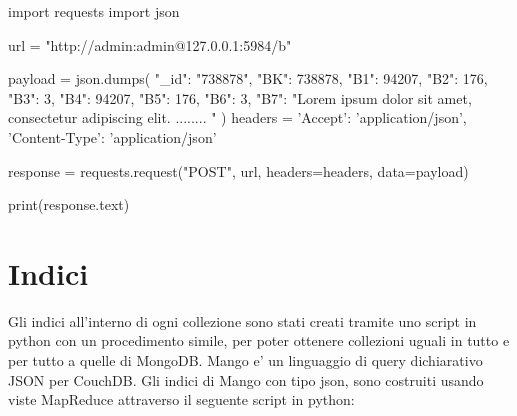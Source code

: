\begin{Verbatim*}
import requests
import json

url = "http://admin:admin@127.0.0.1:5984/b"

payload = json.dumps({
  "_id": "738878",
  "BK": 738878,
  "B1": 94207,
  "B2": 176,
  "B3": 3,
  "B4": 94207,
  "B5": 176,
  "B6": 3,
  "B7": "Lorem ipsum dolor sit amet, consectetur adipiscing elit. ........ " 
})
headers = {
  'Accept': 'application/json', 
  'Content-Type': 'application/json'
}

response = requests.request("POST", url, headers=headers, data=payload)

print(response.text)
\end{Verbatim*}

\section{Indici}

Gli indici all'interno di ogni collezione sono stati creati tramite uno script in python con un procedimento simile, per poter ottenere collezioni uguali in tutto e per tutto a 
quelle di MongoDB. 
Mango e' un linguaggio di query dichiarativo JSON per CouchDB. Gli indici di Mango con tipo json, sono costruiti usando viste MapReduce attraverso il seguente script in python:

